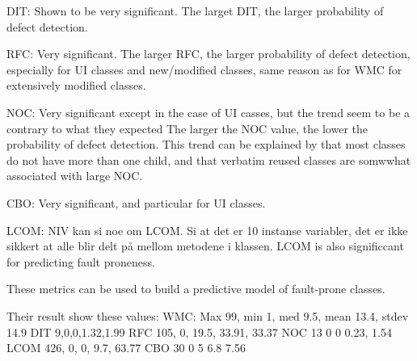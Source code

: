 DIT: Shown to be very significant. The larget DIT, the larger probability of defect detection.

RFC: Very significant. The larger RFC, the larger probability of defect detection, especially for UI classes and new/modified classes, same reason as for WMC for extensively modified classes.

NOC: Very significant except in the case of UI casses, but the trend seem to be a contrary to what they expected The larger the NOC value, the lower the probability of defect detection. This trend can be explained by that most classes do not have more than one child, and that verbatim reused classes are somwwhat associated with large NOC.

CBO: Very significant, and particular for UI classes.

LCOM: NIV kan si noe om LCOM. Si at det er 10 instanse variabler, det er ikke sikkert at alle blir delt på mellom metodene i klassen. LCOM is also significcant for predicting fault proneness.

These metrics can be used to build a predictive model of fault-prone classes.

Their result show these values:
WMC: Max 99, min 1, med 9.5, mean 13.4, stdev 14.9
DIT 9,0,0,1.32,1.99
RFC 105, 0, 19.5, 33.91, 33.37
NOC 13 0 0 0.23, 1.54
LCOM 426, 0, 0, 9.7, 63.77
CBO 30 0 5 6.8 7.56
\fi







